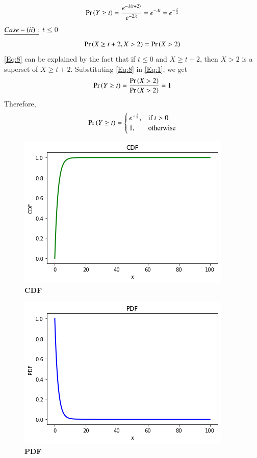\documentclass[journal,12pt,twocolumn]{IEEEtran}
\begin{document}
\begin{align}
\Pr\left(Y \geq t\right) = \frac{e^{-\lambda \left(t+2\right)}}{e^{-2\lambda}} = e^{-\lambda t} = e^{-\frac{t}{2}}
\end{align}
$\underline{Case-\left(ii\right):}$ $t \leq 0$
\begin{align}
\Pr\left(X \geq t+2,X>2\right) = \Pr\left(X>2\right) \label{Eq:8}
\end{align}
\eqref{Eq:8} can be explained by the fact that if $t\leq 0$ and $X \geq t+2$, then $X>2$ is a superset of $X\geq t+2$.  Substituting \eqref{Eq:8} in \eqref{Eq:1}, we get
\begin{align}
\Pr\left(Y \geq t\right) = \frac{\Pr\left(X>2\right)}{\Pr\left(X>2\right)} = 1
\end{align}
Therefore, 
\begin{align}
 \Pr\left(Y \geq t\right) =  \begin{cases}
			e^{-\frac{t}{2}}, & \text{if $t>0$}\\
            1, & \text{otherwise}
		 \end{cases} 
\end{align}
\newpage
\begin{figure}
\includegraphics[width=\columnwidth]{figure_1.png}
    \caption{\textbf{\huge{CDF}}} 
\end{figure}
\begin{figure}
\includegraphics[width=\columnwidth]{figure_2.png}
    \caption{\textbf{\huge{PDF}}}
\end{figure}
\end{document}
